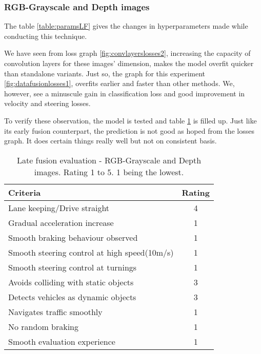\subsubsection*{RGB-Grayscale and Depth images}

The table \ref{table:paramsLF} gives the changes in hyperparameters made while conducting
this technique.

We have seen from loss graph \ref{fig:convlayerslosses2}, increasing the capacity of
convolution layers for these images' dimension, makes the model overfit quicker than
standalone variants. Just so, the graph for this experiment \ref{fig:datafusionlosses1},
overfits earlier and faster than other methods. We, however, see a minuscule gain in
classification loss and good improvement in velocity and steering losses.

To verify these observation, the model is tested and table \ref{table:latefusionrgbdepth}
is filled up. Just like its early fusion counterpart, the prediction is not good as hoped
from the losses graph. It does certain things really well but not on consistent basis.
\begin{table}[!ht]
    \centering
\begin{tabular}{lc}
    \toprule
    Criteria & Rating \\\midrule
    Lane keeping/Drive straight  & 4  \\
    Gradual acceleration increase  & 1\\
    Smooth braking behaviour observed & 1 \\
    Smooth steering control at high speed(10m/s) & 1 \\
    Smooth steering control at turnings & 1\\
    Avoids colliding with static objects & 3 \\
    Detects vehicles as dynamic objects & 3 \\
    Navigates traffic smoothly & 1\\
    No random braking & 1 \\
    Smooth evaluation experience & 1 \\\bottomrule
\end{tabular}
\caption{Late fusion evaluation - RGB-Grayscale and Depth images. Rating 1 to 5. 1 being
the lowest.}
\label{table:latefusionrgbdepth}
\end{table}

